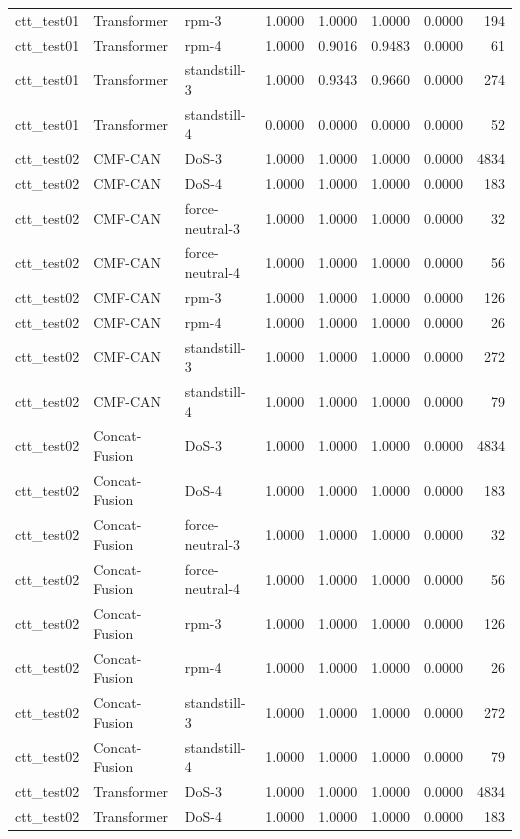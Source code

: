 \begin{tabular}{lllrrrrr}
ctt\_test01 & Transformer & rpm-3 & 1.0000 & 1.0000 & 1.0000 & 0.0000 & 194 \\
ctt\_test01 & Transformer & rpm-4 & 1.0000 & 0.9016 & 0.9483 & 0.0000 & 61 \\
ctt\_test01 & Transformer & standstill-3 & 1.0000 & 0.9343 & 0.9660 & 0.0000 & 274 \\
ctt\_test01 & Transformer & standstill-4 & 0.0000 & 0.0000 & 0.0000 & 0.0000 & 52 \\
ctt\_test02 & CMF-CAN & DoS-3 & 1.0000 & 1.0000 & 1.0000 & 0.0000 & 4834 \\
ctt\_test02 & CMF-CAN & DoS-4 & 1.0000 & 1.0000 & 1.0000 & 0.0000 & 183 \\
ctt\_test02 & CMF-CAN & force-neutral-3 & 1.0000 & 1.0000 & 1.0000 & 0.0000 & 32 \\
ctt\_test02 & CMF-CAN & force-neutral-4 & 1.0000 & 1.0000 & 1.0000 & 0.0000 & 56 \\
ctt\_test02 & CMF-CAN & rpm-3 & 1.0000 & 1.0000 & 1.0000 & 0.0000 & 126 \\
ctt\_test02 & CMF-CAN & rpm-4 & 1.0000 & 1.0000 & 1.0000 & 0.0000 & 26 \\
ctt\_test02 & CMF-CAN & standstill-3 & 1.0000 & 1.0000 & 1.0000 & 0.0000 & 272 \\
ctt\_test02 & CMF-CAN & standstill-4 & 1.0000 & 1.0000 & 1.0000 & 0.0000 & 79 \\
ctt\_test02 & Concat-Fusion & DoS-3 & 1.0000 & 1.0000 & 1.0000 & 0.0000 & 4834 \\
ctt\_test02 & Concat-Fusion & DoS-4 & 1.0000 & 1.0000 & 1.0000 & 0.0000 & 183 \\
ctt\_test02 & Concat-Fusion & force-neutral-3 & 1.0000 & 1.0000 & 1.0000 & 0.0000 & 32 \\
ctt\_test02 & Concat-Fusion & force-neutral-4 & 1.0000 & 1.0000 & 1.0000 & 0.0000 & 56 \\
ctt\_test02 & Concat-Fusion & rpm-3 & 1.0000 & 1.0000 & 1.0000 & 0.0000 & 126 \\
ctt\_test02 & Concat-Fusion & rpm-4 & 1.0000 & 1.0000 & 1.0000 & 0.0000 & 26 \\
ctt\_test02 & Concat-Fusion & standstill-3 & 1.0000 & 1.0000 & 1.0000 & 0.0000 & 272 \\
ctt\_test02 & Concat-Fusion & standstill-4 & 1.0000 & 1.0000 & 1.0000 & 0.0000 & 79 \\
ctt\_test02 & Transformer & DoS-3 & 1.0000 & 1.0000 & 1.0000 & 0.0000 & 4834 \\
ctt\_test02 & Transformer & DoS-4 & 1.0000 & 1.0000 & 1.0000 & 0.0000 & 183 \\

\end{tabular}
